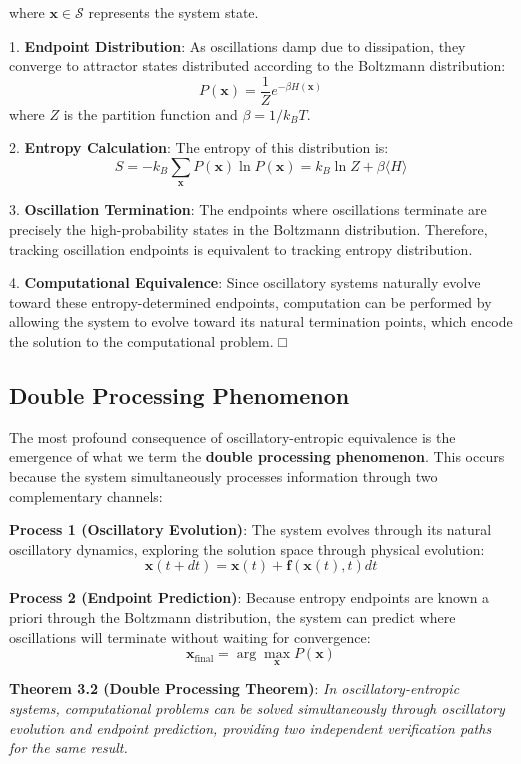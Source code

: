 \documentclass[12pt,a4paper]{article}
\theoremstyle{definition}
\begin{document}
where $\mathbf{x} \in \mathcal{S}$ represents the system state.

1. \textbf{Endpoint Distribution}: As oscillations damp due to dissipation, they converge to attractor states distributed according to the Boltzmann distribution:
   $$P(\mathbf{x}) = \frac{1}{Z}e^{-\beta H(\mathbf{x})}$$
   where $Z$ is the partition function and $\beta = 1/k_B T$.

2. \textbf{Entropy Calculation}: The entropy of this distribution is:
   $$S = -k_B \sum_{\mathbf{x}} P(\mathbf{x}) \ln P(\mathbf{x}) = k_B \ln Z + \beta \langle H \rangle$$

3. \textbf{Oscillation Termination}: The endpoints where oscillations terminate are precisely the high-probability states in the Boltzmann distribution. Therefore, tracking oscillation endpoints is equivalent to tracking entropy distribution.

4. \textbf{Computational Equivalence}: Since oscillatory systems naturally evolve toward these entropy-determined endpoints, computation can be performed by allowing the system to evolve toward its natural termination points, which encode the solution to the computational problem. □

\subsection{Double Processing Phenomenon}

The most profound consequence of oscillatory-entropic equivalence is the emergence of what we term the \textbf{double processing phenomenon}. This occurs because the system simultaneously processes information through two complementary channels:

\textbf{Process 1 (Oscillatory Evolution)}: The system evolves through its natural oscillatory dynamics, exploring the solution space through physical evolution:
$$\mathbf{x}(t+dt) = \mathbf{x}(t) + \mathbf{f}(\mathbf{x}(t), t) dt$$

\textbf{Process 2 (Endpoint Prediction)}: Because entropy endpoints are known a priori through the Boltzmann distribution, the system can predict where oscillations will terminate without waiting for convergence:
$$\mathbf{x}_{\text{final}} = \arg\max_{\mathbf{x}} P(\mathbf{x})$$

\textbf{Theorem 3.2 (Double Processing Theorem)}: \textit{In oscillatory-entropic systems, computational problems can be solved simultaneously through oscillatory evolution and endpoint prediction, providing two independent verification paths for the same result.}
\end{document}
